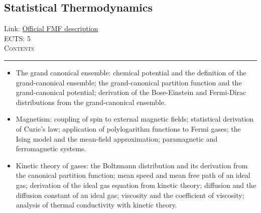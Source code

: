 \documentclass[11pt, a4paper]{article}
\newenvironment{course}[3]{
\subsection{#1}%
Link: \href{#2}{Official FMF description}\\%
ECTS: #3%
\vspace{1ex}
\\
{\large \textsc{Contents}}\\[-0.9ex]%
\rule{\textwidth}{0.5pt}
\vspace{-3ex}
}
{}
\newenvironment{chapter}[1]{
\begin{tcolorbox}[title=#1, breakable]
}
{\end{tcolorbox}}
\begin{document}
\begin{course}{Statistical Thermodynamics}{https://www.fmf.uni-lj.si/en/study-physics/programmes/1fiz/2020/7000777/courses/1174/}{5}
\begin{chapter}{Part 2: Statistical physics}
\begin{itemize}
            \item The grand canonical ensemble: chemical potential and the definition of the grand-canonical ensemble; the grand-canonical partition function and the grand-canonical potential; derivation of the Bose-Einstein and Fermi-Dirac distributions from the grand-canonical ensemble.

            \item Magnetism: coupling of spin to external magnetic fields; statistical derivation of Curie's law; application of polylogarithm functions to Fermi gases; the Ising model and the mean-field approximation; paramagnetic and ferromagnetic systems.

            \item Kinetic theory of gases: the Boltzmann distribution and its derivation from the canonical partition function; mean speed and mean free path of an ideal gas; derivation of the ideal gas equation from kinetic theory; diffusion and the diffusion constant of an ideal gas; viscosity and the coefficient of viscosity; analysis of thermal conductivity with kinetic theory.
        
        \end{itemize}
    \end{chapter}

\end{course}
\end{document}

